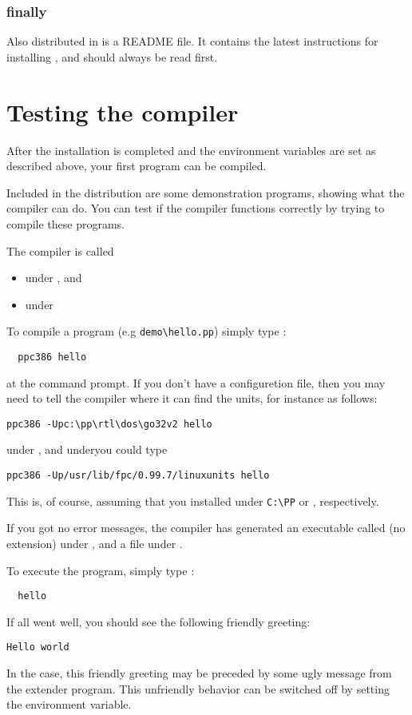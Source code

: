 \documentclass{report}
\begin{document}
\subsubsection{finally}
Also distributed in \fpc is a README file. It contains the latest
instructions for installing \fpc, and should always be read first.


\section{Testing the compiler}
After the installation is completed and the environment variables are
set as described above, your first program can be compiled. 

Included in the \fpc distribution are some demonstration programs, 
showing what the compiler can do. 
You can test if the compiler functions correctly by trying to compile 
these programs.

The compiler is called
\begin{itemize}
\item {} under \dos, and 
\item {} under \linux
\end{itemize}
To compile a program (e.g \verb|demo\hello.pp|) simply type :
\begin{verbatim}
  ppc386 hello
\end{verbatim}
at the command prompt. If you don't have a configuretion file, then you may
need to tell the compiler where it can find the units, for instance as
follows:
\begin{verbatim}
ppc386 -Upc:\pp\rtl\dos\go32v2 hello
\end{verbatim}
under \dos, and under\linux you could type
\begin{verbatim}
ppc386 -Up/usr/lib/fpc/0.99.7/linuxunits hello
\end{verbatim}
This is, of course, assuming that you installed under \verb|C:\PP| or
, respectively.

If you got no error messages, the compiler has generated an executable 
called  (no extension) under \linux, and a file 
under \dos. 

To execute the program, simply type :
\begin{verbatim}
  hello
\end{verbatim}
If all went well, you should see the following friendly greeting:
\begin{verbatim}
Hello world
\end{verbatim}
In the \dos case, this friendly greeting may be preceded by some ugly
message from the  extender program. This unfriendly behavior can 
be switched off by setting the  environment variable.
\end{document}
